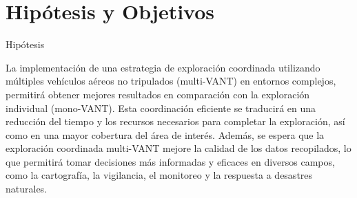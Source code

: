 \documentclass[
  24pt, %
  aspectratio=169, %
]{beamer}
\begin{document}
\begin{frame}
\end{frame}

\section{Hipótesis y Objetivos}

\begin{frame}{Hipótesis}

  La implementación de una estrategia de exploración coordinada utilizando múltiples vehículos aéreos no tripulados (multi-VANT) en entornos complejos, permitirá obtener mejores resultados en comparación con la exploración individual (mono-VANT). Esta coordinación eficiente se traducirá en una reducción del tiempo y los recursos necesarios para completar la exploración, así como en una mayor cobertura del área de interés. Además, se espera que la exploración coordinada multi-VANT mejore la calidad de los datos recopilados, lo que permitirá tomar decisiones más informadas y eficaces en diversos campos, como la cartografía, la vigilancia, el monitoreo y la respuesta a desastres naturales.

  
  
\end{frame}
\end{document}
